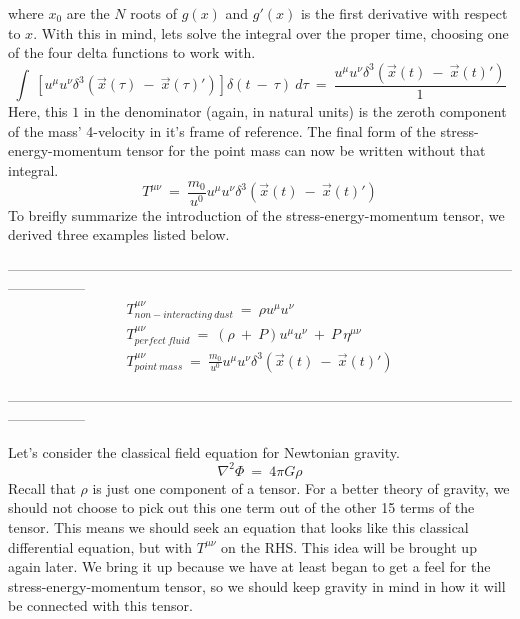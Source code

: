 where $x_0$ are the $N$ roots of $g(x)$ and $g'(x)$ is the first derivative with respect to $x$.
With this in mind, lets solve the integral over the proper time, choosing one of the four delta functions to work with.
\begin{equation}
  \int\ \left [u^{\mu}u^{\nu}\delta^3
    \left (\vec{x}(\tau)\ -\ \vec{x}(\tau)'\right )\right ]\delta\left (t\ -\ \tau\right )\ d\tau\ =\
  \frac{u^{\mu}u^{\nu}\delta^3\left (\vec{x}(t)\ -\ \vec{x}(t)'\right )}{1}
\end{equation}
Here, this $1$ in the denominator (again, in natural units) is the zeroth component of the mass' 4-velocity in it's frame
of reference.  The final form of the stress-energy-momentum tensor for the point mass can now be written without that
integral.
\begin{equation}
  T^{\mu\nu}\ =\ \frac{m_0}{u^0}u^{\mu}u^{\nu}\delta^3\left (\vec{x}(t)\ -\ \vec{x}(t)'\right )
\end{equation}
To breifly summarize the introduction of the stress-energy-momentum tensor, we derived three examples listed
below.

-----------------------------------------------------------------------------------------------------------------------------
\begin{gather}
  T_{\mathit{non-interacting\ dust}}^{\mu\nu}\ =\ \rho u^{\mu}u^{\nu} \\
  T_{\mathit{perfect\ fluid}}^{\mu\nu}\ =\ \left(\rho\ +\ P\right)u^{\mu}u^{\nu}\ +\ P\ \eta^{\mu\nu} \\
  T_{\mathit{point\ mass}}^{\mu\nu}\ =\ \frac{m_0}{u^0}u^{\mu}u^{\nu}\delta^3\left (\vec{x}(t)\ -\ \vec{x}(t)'\right )
\end{gather}

-----------------------------------------------------------------------------------------------------------------------------

\hskip 25pt Let's consider the classical field equation for Newtonian gravity.  
\begin{equation}
  \nabla^2\Phi\ =\ 4\pi G\rho
\end{equation}
Recall that $\rho$ is just one component of a tensor.  For a better theory of gravity, we should not choose to
pick out this one term out of the other 15 terms of the tensor.  This means we should seek an equation that looks like
this classical differential equation, but with $T^{\mu\nu}$ on the RHS.  This idea will be brought up again later.  We
bring it up because we have at least began to get a feel for the stress-energy-momentum tensor, so we should keep gravity
in mind in how it will be connected with this tensor.

